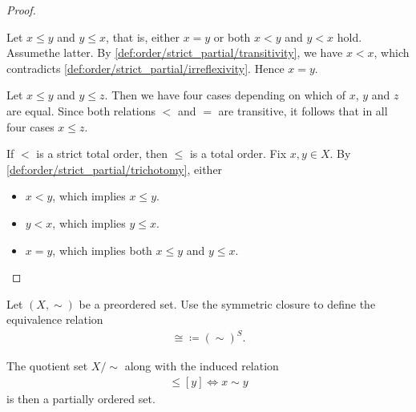 \begin{proof}
\begin{description}
     Let \( x \leq y \) and \( y \leq x \), that is, either \( x = y \) or both \( x < y \) and \( y < x \) hold. Assume\LEM the latter. By \ref{def:order/strict_partial/transitivity}, we have \( x < x \), which contradicts \ref{def:order/strict_partial/irreflexivity}. Hence \( x = y \).

     Let \( x \leq y \) and \( y \leq z \). Then we have four cases depending on which of \( x \), \( y \) and \( z \) are equal. Since both relations \( < \) and \( = \) are transitive, it follows that in all four cases \( x \leq z \).

     If \( < \) is a strict total order, then \( \leq \) is a total order. Fix \( x, y \in X \). By \ref{def:order/strict_partial/trichotomy}, either
    \begin{itemize}
      \item \( x < y \), which implies \( x \leq y \).
      \item \( y < x \), which implies \( y \leq x \).
      \item \( x = y \), which implies both \( x \leq y \) and \( y \leq x \).
    \end{itemize}
  \end{description}
\end{proof}

\begin{proposition}\label{thm:preorder_to_partial_order}
  Let \( (X, \sim) \) be a preordered set. Use the symmetric closure to define the equivalence relation
  \begin{align*}
    \cong \coloneqq (\sim)^S.
  \end{align*}

  The quotient set \( X / \sim \) along with the induced relation
  \begin{align*}
    [x] \leq [y] \iff x \sim y
  \end{align*}
  is then a partially ordered set.
\end{proposition}
